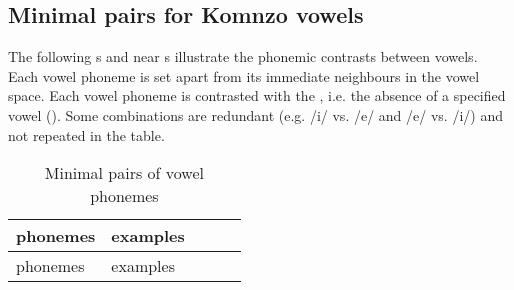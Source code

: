 \subsection{Minimal pairs for Komnzo vowels} \label{minimalpairsvowels}
\largerpage
The following s and near s illustrate the phonemic contrasts between vowels. Each vowel phoneme is set apart from its immediate neighbours in the vowel space. Each vowel phoneme is contrasted with the , i.e. the absence of a specified vowel (\Zero{}). Some combinations are redundant (e.g. /i/ vs. /e/ and /e/ vs. /i/) and not repeated in the table.

\begin{longtable} {lllll}
\caption{Minimal pairs of vowel phonemes}
\label{minpairvow}\\
	\lsptoprule
	phonemes&examples&&&\\ \midrule
	\endfirsthead
	phonemes&examples&\\ \midrule
	\endhead


\end{longtable}
